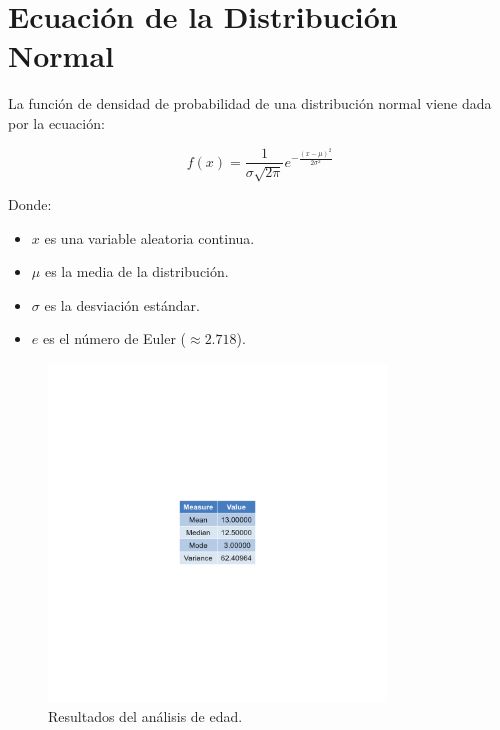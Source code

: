 \documentclass{article}
\begin{document}
\section*{Ecuación de la Distribución Normal}

La función de densidad de probabilidad de una distribución normal viene dada por la ecuación:

\[
f(x) = \frac{1}{\sigma \sqrt{2\pi}} e^{-\frac{(x - \mu)^2}{2\sigma^2}}
\]

Donde:
\begin{itemize}
    \item $x$ es una variable aleatoria continua.
    \item $\mu$ es la media de la distribución.
    \item $\sigma$ es la desviación estándar.
    \item $e$ es el número de Euler ($\approx 2.718$).
\end{itemize}


\begin{figure}[htbp]
    \centering
    \includegraphics[width=0.8\textwidth]{age_resultados.png}
    \caption{Resultados del análisis de edad.}
\end{figure}
\end{document}
